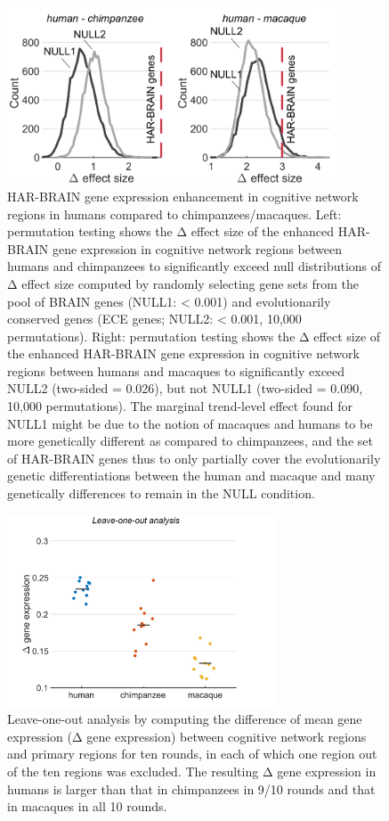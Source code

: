 \begin{refsection}
\begin{figure}[H]
    \centering
    \includegraphics[width=10cm]{images/harFigS5.png}
    \caption{HAR-BRAIN gene expression enhancement in cognitive network regions in humans compared to chimpanzees/macaques. Left: permutation testing shows the Δ effect size of the enhanced HAR-BRAIN gene expression in cognitive network regions between humans and chimpanzees to significantly exceed null distributions of Δ effect size computed by randomly selecting gene sets from the pool of BRAIN genes (NULL1: \pval < 0.001) and evolutionarily conserved genes (ECE genes; NULL2: \pval < 0.001, 10,000 permutations). Right: permutation testing shows the Δ effect size of the enhanced HAR-BRAIN gene expression in cognitive network regions between humans and macaques to significantly exceed NULL2 (two-sided \pval = 0.026), but not NULL1 (two-sided \pval = 0.090, 10,000 permutations). The marginal trend-level effect found for NULL1 might be due to the notion of macaques and humans to be more genetically different as compared to chimpanzees, and the set of HAR-BRAIN genes thus to only partially cover the evolutionarily genetic differentiations between the human and macaque and many genetically differences to remain in the NULL condition.}
    \label{harFigs5}
\end{figure}

\begin{figure}[H]
    \centering
    \includegraphics[width=8cm]{images/harFigS6.png}
    \caption{Leave-one-out analysis by computing the difference of mean gene expression (Δ gene expression) between cognitive network regions and primary regions for ten rounds, in each of which one region out of the ten regions was excluded. The resulting Δ gene expression in humans is larger than that in chimpanzees in 9/10 rounds and that in macaques in all 10 rounds.}
    \label{harFigs6}
\end{figure}


\end{refsection}
